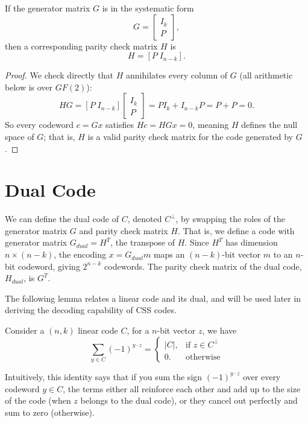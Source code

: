 \begin{theorem}
If the generator matrix \(G\) is in the systematic form 
$$G = \begin{bmatrix}
    I_{k} \\
    P
    \end{bmatrix},
$$
then a corresponding parity check matrix \(H\) is 
\[H = [P \; I_{n-k}].\]
\label{thm:HfromG}
\end{theorem}


\begin{proof}
We check directly that \(H\) annihilates every column of \(G\) (all arithmetic below is over \(GF(2)\)):
\[
HG = [P \; I_{n-k}] \begin{bmatrix} I_k \\ P \end{bmatrix} = P I_k + I_{n-k} P = P + P = 0.
\]
So every codeword \(c = Gx\) satisfies \(Hc = HGx = 0\), meaning \(H\) defines the null space of \(G\); that is, \(H\) is a valid parity check matrix for the code generated by \(G\).
\end{proof}

\section{Dual Code}
We can define the dual code of \(C\), denoted \(C^{\perp}\), by swapping the roles of the generator matrix \(G\) and parity check matrix \(H\). That is, we define a code with generator matrix \(G_{dual} = H^T\), the transpose of \(H\). Since \(H^T\) has dimension \(n \times (n-k)\), the encoding \(x = G_{dual} m\) maps an \((n-k)\)-bit vector \(m\) to an \(n\)-bit codeword, giving \(2^{n-k}\) codewords. The parity check matrix of the dual code, \(H_{dual}\), is \(G^T\). 

The following lemma relates a linear code and its dual, and will be used later in deriving the decoding capability of CSS codes. 

\begin{lemma}
    Consider a \((n,k)\) linear code \(C\), for a \(n\)-bit vector \(z\), we have  
    \[
     \sum_{y \in C} (-1)^{y \cdot z} =
     \begin{cases}
    |C|, & \text{if } z \in C^{\perp} \\
    0.  & \text{otherwise}
    \end{cases}
    \]
\label{lemma:IdentityDual}
\end{lemma}

Intuitively, this identity says that if you sum the sign \((-1)^{y\cdot z}\) over every codeword \(y \in C\), the terms either all reinforce each other and add up to the size of the code (when \(z\) belongs to the dual code), or they cancel out perfectly and sum to zero (otherwise).

